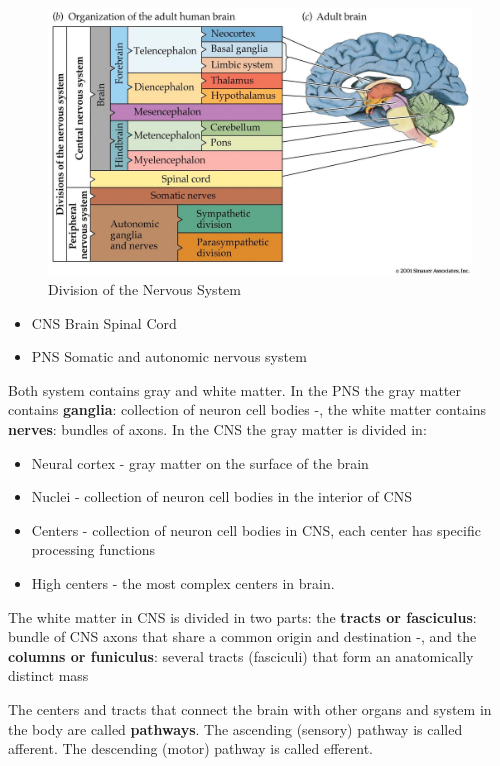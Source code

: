 \documentclass[12pt,article,oneside,a4paper]{memoir}
\begin{document}
\begin{figure}
  \includegraphics[width=\linewidth]{imgs/division_nervous_system.jpg}
  \caption{Division of the Nervous System}
  \label{fig:nervousSystem}
\end{figure}

\begin{itemize}
\item CNS
\subitem Brain
\subitem Spinal Cord
\item PNS
\subitem Somatic and autonomic nervous system
\end{itemize}

Both system contains gray and white matter.
In the PNS the gray matter contains \textbf{ganglia}: collection of neuron cell
bodies -, the white matter contains \textbf{nerves}: bundles of axons.
In the CNS the gray matter is divided in:
\begin{itemize}
\item Neural cortex - gray matter on the surface of the brain
\item Nuclei - collection of neuron cell bodies in the interior of CNS
\item Centers - collection of neuron cell bodies in CNS, each center has specific processing functions
\item High centers - the most complex centers in brain.
\end{itemize}
The white matter in CNS is divided in two parts: the \textbf{tracts or fasciculus}: bundle of CNS axons
that share a common origin and destination -, and the \textbf{columns or funiculus}: several tracts (fasciculi) that form an anatomically distinct mass

The centers and tracts that connect the brain with other organs and system in
the body are called \textbf{pathways}. The ascending (sensory) pathway is called afferent.
The descending (motor) pathway is called efferent.
\end{document}
